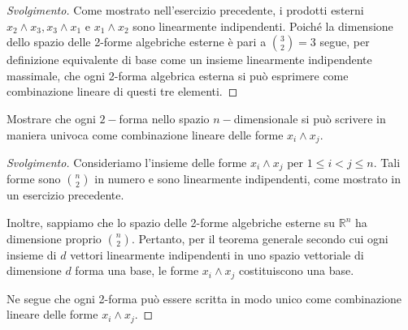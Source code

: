 \begin{proof}[Svolgimento]
    Come mostrato nell'esercizio precedente, i prodotti esterni \( x_2 \wedge x_3, x_3 \wedge x_1 \) e \( x_1 \wedge x_2 \) sono linearmente indipendenti. Poiché la dimensione dello spazio delle 2-forme algebriche esterne è pari a \( \binom{3}{2} = 3 \) segue, per definizione equivalente di base come un insieme linearmente indipendente massimale, che ogni 2-forma algebrica esterna si può esprimere come combinazione lineare di questi tre elementi.
\end{proof}
\begin{exercise}
    Mostrare che ogni $2-$forma nello spazio $n-$dimensionale si può scrivere in maniera univoca come combinazione lineare delle forme $x_i \wedge x_j$.
\end{exercise}
\begin{proof}[Svolgimento]
    Consideriamo l'insieme delle forme $x_i \wedge x_j$ per $1 \le i < j \le n$. Tali forme sono $ \binom{n}{2} $ in numero e sono linearmente indipendenti, come mostrato in un esercizio precedente.

    Inoltre, sappiamo che lo spazio delle 2-forme algebriche esterne su \( \mathbb{R}^n \) ha dimensione proprio \( \binom{n}{2} \). Pertanto, per il teorema generale secondo cui ogni insieme di \( d \) vettori linearmente indipendenti in uno spazio vettoriale di dimensione \( d \) forma una base, le forme \( x_i \wedge x_j \) costituiscono una base.

    Ne segue che ogni 2-forma può essere scritta in modo unico come combinazione lineare delle forme \( x_i \wedge x_j \).
\end{proof}

